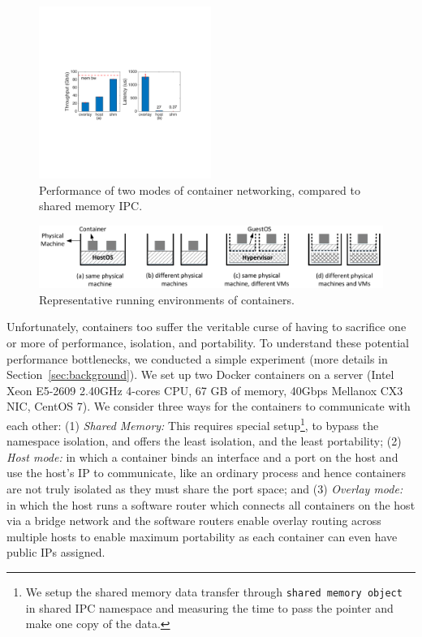 \begin{figure}[th]
     \centering 
     \includegraphics[width=0.5\textwidth]{figures/intro/intro_exist2.pdf} 
     \caption{Performance of two modes of container networking, compared to
     shared memory IPC.} 
     \label{fig:three_modes} 
\end{figure} 
\begin{figure} [t]
	\centering   
	\includegraphics[width=6.7in]{figures/deployment-cases.pdf}   
	\caption{\label{fig:deploy-cases} Representative running environments of containers.}   
\end{figure}

Unfortunately, containers too suffer the veritable curse of having to sacrifice
one or more of performance, isolation, and portability. To understand these
potential performance bottlenecks, we conducted a simple experiment (more details
in Section~\ref{sec:background}). We set up two Docker containers on a server
(Intel Xeon E5-2609 2.40GHz 4-cores CPU, 67 GB of memory, 40Gbps Mellanox CX3 NIC,
CentOS 7). We consider three ways for the containers to communicate with each
other: (1) {\em Shared Memory:} This requires special setup\footnote{We 
setup the shared memory data transfer through \texttt{shared memory object} in
shared IPC namespace and measuring the time to pass the pointer and make one copy
of the data.}, to bypass the
namespace isolation, and offers the least isolation, and the least portability;
(2) {\em Host mode:} in which a container binds an interface and a port on the
host and use the host's IP to communicate, like an ordinary process and hence
containers are not truly isolated as they must share the port space; and (3) {\em Overlay
mode:} in which the host runs a software router which connects all containers on
the host via a bridge network and the software routers enable overlay routing
across multiple hosts to enable maximum portability as each container can even
have public IPs assigned.

